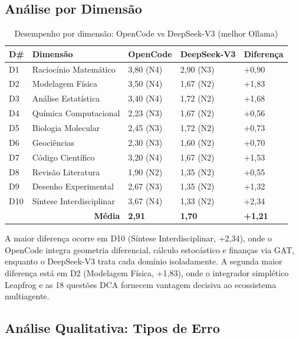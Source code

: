 \subsection{Análise por Dimensão}

\begin{table}[H]\centering
\caption{Desempenho por dimensão: OpenCode vs DeepSeek-V3 (melhor Ollama)}
\label{tab:dim_comparison}
\begin{tabular}{p{}p{}p{}p{}p{}}
\toprule
\textbf{D\#} & \textbf{Dimensão} & \textbf{OpenCode} & \textbf{DeepSeek-V3} & \textbf{Diferença} \\
\midrule
D1 & Raciocínio Matemático & 3,80 (N4) & 2,90 (N3) & +0,90 \\
D2 & Modelagem Física & 3,50 (N4) & 1,67 (N2) & +1,83 \\
D3 & Análise Estatística & 3,40 (N4) & 1,72 (N2) & +1,68 \\
D4 & Química Computacional & 2,23 (N3) & 1,67 (N2) & +0,56 \\
D5 & Biologia Molecular & 2,45 (N3) & 1,72 (N2) & +0,73 \\
D6 & Geociências & 2,30 (N3) & 1,60 (N2) & +0,70 \\
D7 & Código Científico & 3,20 (N4) & 1,67 (N2) & +1,53 \\
D8 & Revisão Literatura & 1,90 (N2) & 1,35 (N2) & +0,55 \\
D9 & Desenho Experimental & 2,67 (N3) & 1,35 (N2) & +1,32 \\
D10 & Síntese Interdisciplinar & 3,67 (N4) & 1,33 (N2) & +2,34 \\
\midrule
\multicolumn{2}{r}{\textbf{Média}} & \textbf{2,91} & \textbf{1,70} & \textbf{+1,21} \\
\bottomrule
\end{tabular}
\end{table}

A maior diferença ocorre em D10 (Síntese Interdisciplinar, +2,34), onde o
OpenCode integra geometria diferencial, cálculo estocástico e finanças via
GAT, enquanto o DeepSeek-V3 trata cada domínio isoladamente. A segunda maior
diferença está em D2 (Modelagem Física, +1,83), onde o integrador simplético
Leapfrog e as 18 questões DCA fornecem vantagem decisiva ao ecossistema
multiagente.

\subsection{Análise Qualitativa: Tipos de Erro}

